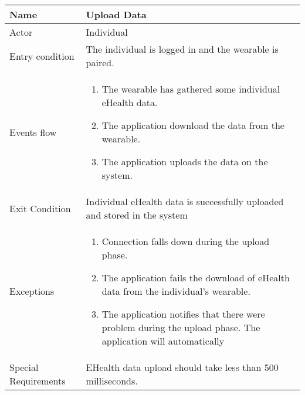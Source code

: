 \begin{tabular}{|l|p{13cm}|}
    \hline
    Name & Upload Data
    \\ \hline
    Actor & Individual
    \\ \hline 
    Entry condition & The individual is logged in and the wearable is paired.
    \\ \hline
    Events flow &
    \begin{enumerate}
    \item The wearable has gathered some individual eHealth data.
    \item The application download the data from the wearable.
    \item The application uploads the data on the system.
    \end{enumerate}
     \\ \hline
     Exit Condition & Individual eHealth data is successfully uploaded and stored in the system
     \\
    \hline
    Exceptions &
        \begin{enumerate}
    \item Connection falls down during the upload phase.
    \item The application fails the download of eHealth data from the individual's wearable.
    \item The application notifies that there were problem during the upload phase. The application will automatically 
    \end{enumerate}
      \\
    \hline
    Special Requirements & EHealth data upload should take less than 500 milliseconds.
\end{tabular}



